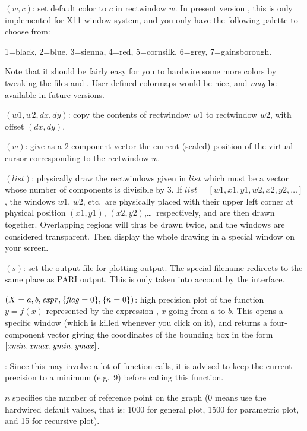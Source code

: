 $(w,c)$: set default color to $c$ in rectwindow $w$.
In present version \vers, this is only implemented for X11 window system,
and you only have the following palette to choose from:

1=black, 2=blue, 3=sienna, 4=red, 5=cornsilk, 6=grey, 7=gainsborough.

Note that it should be fairly easy for you to hardwire some more colors by
tweaking the files  and . User-defined
colormaps would be nice, and \emph{may} be available in future versions.

$(w1,w2,dx,dy)$: copy the contents of rectwindow
$w1$ to rectwindow $w2$, with offset $(dx,dy)$.

$(w)$: give as a 2-component vector the current
(scaled) position of the virtual cursor corresponding to the rectwindow $w$.

$(list)$: physically draw the rectwindows given in $list$
which must be a vector whose number of components is divisible by 3. If
$list=[w1,x1,y1,w2,x2,y2,\dots]$, the windows $w1$, $w2$, etc.~are
physically placed with their upper left corner at physical position
$(x1,y1)$, $(x2,y2)$,\dots\ respectively, and are then drawn together.
Overlapping regions will thus be drawn twice, and the windows are considered
transparent. Then display the whole drawing in a special window on your
screen.

$(s)$: set the output file for plotting output. The
special filename  redirects to the same place as PARI output. This
is only taken into account by the  interface.

$(X=a,b,\hbox{\it expr\/},\{\hbox{\it f\kern0pt lag\/}=0\},\{n=0\})$: high precision
plot of the function $y=f(x)$ represented by the expression , $x$
going from $a$ to $b$. This opens a specific window (which is killed
whenever you click on it), and returns a four-component vector giving the
coordinates of the bounding box in the form
$[\hbox{\it xmin\/},\hbox{\it xmax\/},\hbox{\it ymin\/},\hbox{\it ymax\/}]$.

: Since this may involve a lot of function calls,
it is advised to keep the current precision to a minimum (e.g.~9) before
calling this function.

$n$ specifies the number of reference point on the graph (0 means use the
hardwired default values, that is: 1000 for general plot, 1500 for
parametric plot, and 15 for recursive plot).

